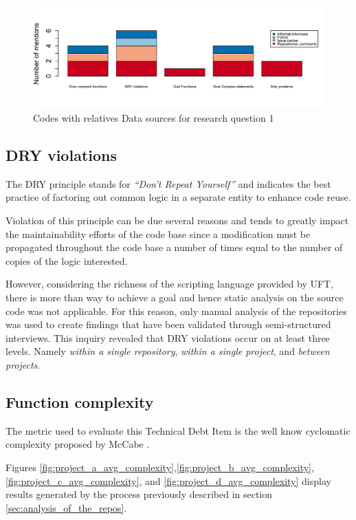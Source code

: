 \begin{figure}[!htbp]
    \centering
    \includegraphics[width=\textwidth,keepaspectratio]{figure/results/rq1/sources.pdf}
    \caption{Codes with relatives Data sources for research question 1}
    \label{fig:rq1_sources}
\end{figure}

\FloatBarrier

\subsection{DRY violations}
The DRY principle stands for \textit{``Don't Repeat Yourself''} and indicates the best practice of factoring out common logic in a separate entity to enhance code reuse.

Violation of this principle can be due several reasons and tends to greatly impact the maintainability efforts of the code base since a modification must be propagated throughout the code base a number of times equal to the number of copies of the logic interested.

However, considering the richness of the scripting language provided by UFT, there is more than way to achieve a goal and hence static analysis on the source code was not applicable. For this reason, only manual analysis of the repositories was used to create findings that have been validated through semi-structured interviews. This inquiry revealed that DRY violations occur on at least three levels. Namely \textit{within a single repository}, \textit{within a single project}, and \textit{between projects}.


\subsection{Function complexity}
The metric used to evaluate this Technical Debt Item is the well know cyclomatic complexity proposed by McCabe \cite{cyclomatic_complexity}.


    Figures \ref{fig:project_a_avg_complexity},\ref{fig:project_b_avg_complexity},\ref{fig:project_c_avg_complexity}, and \ref{fig:project_d_avg_complexity} display results generated by the process previously described in section \ref{sec:analysis_of_the_repos}.

